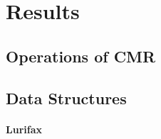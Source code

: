 \chapter{Results}
\lorem{}

\section{Operations of CMR}
\lorem{}

\section{Data Structures}
\lorem{}

\subsubsection{Lurifax}

